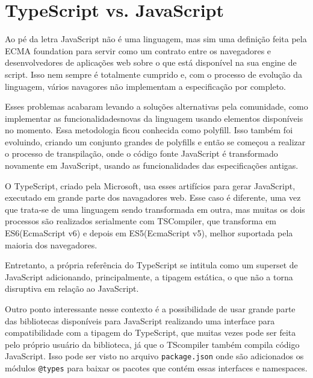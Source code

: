 \documentclass[rel_mlp]{iiufrgs}
\begin{document}
\section{TypeScript vs. JavaScript}
Ao pé da letra JavaScript não é uma linguagem, mas sim uma definição feita pela ECMA foundation para servir como um contrato entre os navegadores e desenvolvedores de aplicações web sobre o que está disponível na sua engine de script. Isso nem sempre é totalmente cumprido e, com o processo de evolução da linguagem, vários navagores não implementam a especificação por completo. \par
Esses problemas acabaram levando a soluções alternativas pela comunidade, como implementar as funcionalidadesnovas da linguagem usando elementos disponíveis no momento. Essa metodologia ficou conhecida como polyfill. Isso também foi evoluindo, criando um conjunto grandes de polyfills e então se começou a realizar o processo de transpilação, onde o código fonte JavaScript é transformado novamente em JavaScript, usando as funcionalidades das especificações antigas. \par
O TypeScript, criado pela Microsoft, usa esses artifícios para gerar JavaScript, executado em grande parte dos navagadores web. Esse caso é diferente, uma vez que trata-se de uma linguagem sendo transformada em outra, mas muitas os dois processos são realizados serialmente com TSCompiler, que transforma em ES6(EcmaScript v6) e depois em ES5(EcmaScript v5), melhor suportada pela maioria dos navegadores. \par
Entretanto, a própria referência do TypeScript se intitula como um superset de JavaScript adicionando, principalmente, a tipagem estática, o que não a torna disruptiva em relação ao JavaScript.\par
Outro ponto interessante nesse contexto é a possibilidade de usar grande parte das bibliotecas disponíveis para JavaScript realizando uma interface para compatibilidade com a tipagem do TypeScript, que muitas vezes pode ser feita pelo próprio usuário da biblioteca, já que o TScompiler também compila código JavaScript. Isso pode ser visto no arquivo \verb|package.json| onde são adicionados os módulos \verb|@types| para baixar os pacotes que contém essas interfaces e namespaces.
\end{document}

